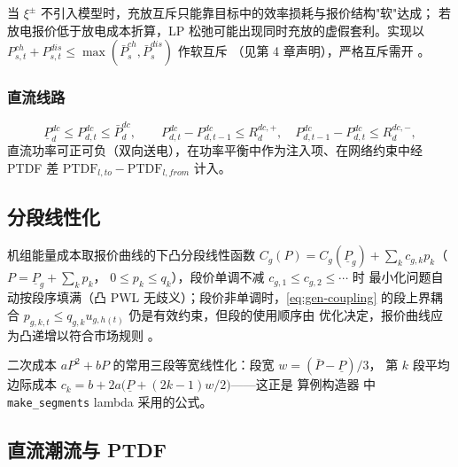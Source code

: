 \begin{remark}[无指示变量时的松弛]
当 $\xi^\pm$ 不引入模型时，充放互斥只能靠目标中的效率损耗与报价结构"软"达成；
若放电报价低于放电成本折算，LP 松弛可能出现同时充放的虚假套利。实现以
$P^{ch}_{s,t}+P^{dis}_{s,t}\le\max(\bar P^{ch}_s,\bar P^{dis}_s)$ 作软互斥
（见第 4 章声明），严格互斥需开 。
\end{remark}

\subsubsection{直流线路}

\begin{equation}
\underline P^{dc}_d\le P^{dc}_{d,t}\le \bar P^{dc}_d,\qquad
P^{dc}_{d,t}-P^{dc}_{d,t-1}\le R^{dc,+}_d,\quad
P^{dc}_{d,t-1}-P^{dc}_{d,t}\le R^{dc,-}_d,
\label{eq:dcline}
\end{equation}
直流功率可正可负（双向送电），在功率平衡中作为注入项、在网络约束中经
PTDF 差 $\mathrm{PTDF}_{l,to}-\mathrm{PTDF}_{l,from}$ 计入。

\subsection{分段线性化}
\label{sec:pwl}

\begin{definition}[分段线性能量成本]
机组能量成本取报价曲线的下凸分段线性函数
$C_g(P)=C_g(\underline P_g)+\sum_k c_{g,k} p_k$（$P=\underline P_g+\sum_k p_k$，
$0\le p_k\le q_k$），段价单调不减 $c_{g,1}\le c_{g,2}\le\cdots$ 时
最小化问题自动按段序填满（凸 PWL 无歧义）；段价非单调时，\eqref{eq:gen-coupling}
的段上界耦合 $p_{g,k,t}\le q_{g,k}u_{g,h(t)}$ 仍是有效约束，但段的使用顺序由
优化决定，报价曲线应为凸递增以符合市场规则 \cite{southern2025,wood2013}。
\end{definition}

\begin{remark}
二次成本 $aP^2+bP$ 的常用三段等宽线性化：段宽 $w=(\bar P-\underline P)/3$，
第 $k$ 段平均边际成本 $c_k=b+2a\big(\underline P+(2k-1)w/2\big)$——这正是
算例构造器  中
\texttt{make\_segments} lambda 采用的公式。
\end{remark}

\subsection{直流潮流与 PTDF}
\label{sec:dcflow}

